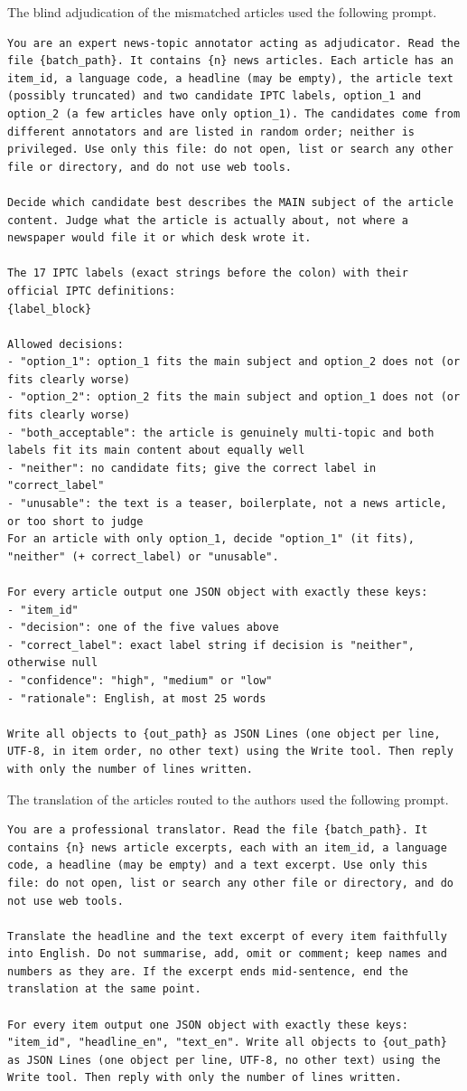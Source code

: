 \documentclass[journal,onecolumn]{IEEEtran}
\begin{document}
The blind adjudication of the mismatched articles used the following prompt.
\begin{lstlisting}
You are an expert news-topic annotator acting as adjudicator. Read the file {batch_path}. It contains {n} news articles. Each article has an item_id, a language code, a headline (may be empty), the article text (possibly truncated) and two candidate IPTC labels, option_1 and option_2 (a few articles have only option_1). The candidates come from different annotators and are listed in random order; neither is privileged. Use only this file: do not open, list or search any other file or directory, and do not use web tools.

Decide which candidate best describes the MAIN subject of the article content. Judge what the article is actually about, not where a newspaper would file it or which desk wrote it.

The 17 IPTC labels (exact strings before the colon) with their official IPTC definitions:
{label_block}

Allowed decisions:
- "option_1": option_1 fits the main subject and option_2 does not (or fits clearly worse)
- "option_2": option_2 fits the main subject and option_1 does not (or fits clearly worse)
- "both_acceptable": the article is genuinely multi-topic and both labels fit its main content about equally well
- "neither": no candidate fits; give the correct label in "correct_label"
- "unusable": the text is a teaser, boilerplate, not a news article, or too short to judge
For an article with only option_1, decide "option_1" (it fits), "neither" (+ correct_label) or "unusable".

For every article output one JSON object with exactly these keys:
- "item_id"
- "decision": one of the five values above
- "correct_label": exact label string if decision is "neither", otherwise null
- "confidence": "high", "medium" or "low"
- "rationale": English, at most 25 words

Write all objects to {out_path} as JSON Lines (one object per line, UTF-8, in item order, no other text) using the Write tool. Then reply with only the number of lines written.
\end{lstlisting}
The translation of the articles routed to the authors used the following prompt.
\begin{lstlisting}
You are a professional translator. Read the file {batch_path}. It contains {n} news article excerpts, each with an item_id, a language code, a headline (may be empty) and a text excerpt. Use only this file: do not open, list or search any other file or directory, and do not use web tools.

Translate the headline and the text excerpt of every item faithfully into English. Do not summarise, add, omit or comment; keep names and numbers as they are. If the excerpt ends mid-sentence, end the translation at the same point.

For every item output one JSON object with exactly these keys: "item_id", "headline_en", "text_en". Write all objects to {out_path} as JSON Lines (one object per line, UTF-8, no other text) using the Write tool. Then reply with only the number of lines written.
\end{lstlisting}
\end{document}
